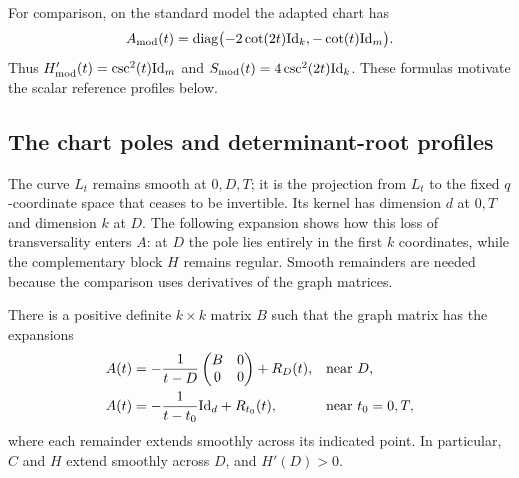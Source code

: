 For comparison, on the standard model the adapted chart has
\[
 A_{\mathrm{mod}}(t)
 =\operatorname{diag}\bigl(-2\cot(2t)\mathrm{Id}_k,-\cot(t)\mathrm{Id}_m\bigr).
\]
Thus $H'_{\mathrm{mod}}(t)=\csc^2(t)\mathrm{Id}_m$ and
$S_{\mathrm{mod}}(t)=4\csc^2(2t)\mathrm{Id}_k$.
These formulas motivate the scalar reference profiles below.

\subsection{The chart poles and determinant-root profiles}

The curve $L_t$ remains smooth at $0,D,T$; it is the projection from
$L_t$ to the fixed $q$-coordinate space that ceases to be invertible.
Its kernel has dimension $d$ at $0,T$ and dimension $k$ at $D$.
The following expansion shows how this loss of transversality enters
$A$: at $D$ the pole lies entirely in the first $k$ coordinates,
while the complementary block $H$ remains regular.  Smooth remainders
are needed because the comparison uses derivatives of the graph matrices.

\begin{lemma}
\label{lag:poles}
There is a positive definite $k\times k$ matrix $B$ such that the graph
matrix has the expansions
\begin{align}
 A(t)&=-\frac1{t-D}
 \begin{pmatrix}B&0\\0&0\end{pmatrix}+R_D(t),
 &&\text{near }D,\label{eq:lag-middle-pole}\\
 A(t)&=-\frac1{t-t_0}\mathrm{Id}_d+R_{t_0}(t),
 &&\text{near }t_0=0,T,\label{eq:lag-end-poles}
\end{align}
where each remainder extends smoothly across its indicated point.
In particular, $C$ and $H$ extend smoothly across $D$, and
$H'(D)>0$.
\end{lemma}

